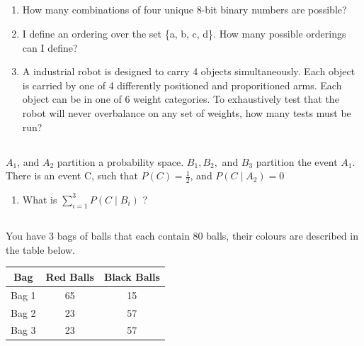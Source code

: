 \documentclass[twocolumn]{article}
\newcommand\mrk[1]{}
\begin{document}
\subsection{}

    \begin{enumerate}
        \item How many combinations of four unique 8-bit binary numbers are possible? \mrk{1}
        \item I define an ordering over the set \{a, b, c, d\}. How many possible orderings can I define? \mrk{1}
        \item A industrial robot is designed to carry 4 objects simultaneously. Each object is carried by one of 4 differently positioned and proporitioned arms. Each object can be in one of 6 weight categories. To exhaustively test that the robot will never overbalance on any set of weights, how many tests must be run? \mrk{1}
    \end{enumerate}

\subsection{}

    $A_1$, and $A_2$ partition a probability space. $B_1, B_2,$ and $B_3$ partition the event $A_1$. There is an event C, such that $P(C) = \frac{1}{2}$, and $P(C \mid A_2) = 0$
    
    \begin{enumerate}
        \item What is $\sum_{i=1}^3 P(C \mid B_i) $ ? \mrk{1}
    \end{enumerate}
    
\subsection{}

    You have 3 bags of balls that each contain 80 balls, their colours are described in the table below.

    \begin{table}[h!]
        \centering
        \begin{tabular}{c | c | c }
            \toprule
            Bag & Red Balls & Black Balls \\
            \midrule
            Bag 1 & 65 & 15  \\
            Bag 2 & 23 & 57  \\
            Bag 3 & 23 & 57 \\
            \bottomrule
        \end{tabular}
    \end{table}
\end{document}
